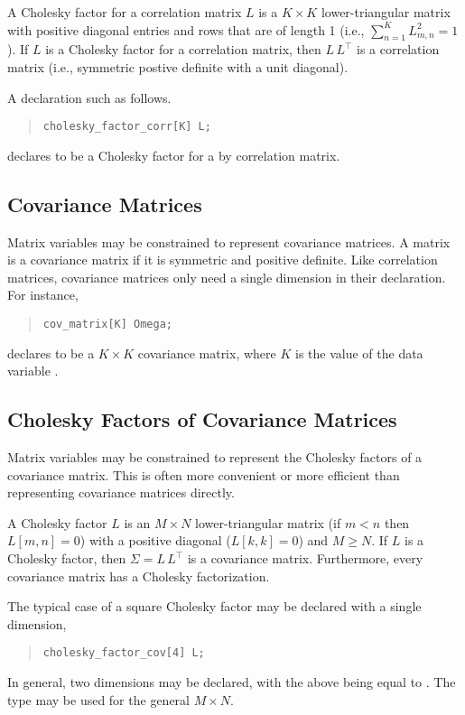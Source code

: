 A Cholesky factor for a correlation matrix $L$ is a $K \times K$
lower-triangular matrix with positive diagonal entries and rows that
are of length 1 (i.e., $\sum_{n=1}^K L_{m,n}^2 = 1$).  If $L$ is a
Cholesky factor for a correlation matrix, then $L\,L^{\top}$ is a
correlation matrix (i.e., symmetric postive definite with a unit
diagonal).

A declaration such as 
follows.
%
\begin{quote}
\begin{Verbatim}
cholesky_factor_corr[K] L;
\end{Verbatim}
\end{quote}
%
declares  to be a Cholesky factor for a  by 
correlation matrix.  

\subsection{Covariance Matrices}

Matrix variables may be constrained to represent covariance matrices.
A matrix is a covariance matrix if it is symmetric and positive
definite.  Like correlation matrices, covariance matrices only need a
single dimension in their declaration.  For instance,
%
\begin{quote}
\begin{Verbatim} 
cov_matrix[K] Omega;
\end{Verbatim}
\end{quote}
% 
declares  to be a $K \times K$ covariance matrix, where
$K$ is the value of the data variable .  

\subsection{Cholesky Factors of Covariance Matrices}

Matrix variables may be constrained to represent the Cholesky factors
of a covariance matrix.  This is often more convenient or more
efficient than representing covariance matrices directly.  

A Cholesky factor $L$ is an $M \times N$ lower-triangular matrix (if
$m < n$ then $L[m,n] =0$) with a positive diagonal ($L[k,k] = 0$) and
$M \geq N$.  If $L$ is a Cholesky factor, then $\Sigma = L \, L^{\top}$
is a covariance matrix.  Furthermore, every covariance matrix has a
Cholesky factorization.

The typical case of a square Cholesky factor may be declared with a
single dimension,
%
\begin{quote}
\begin{Verbatim}
cholesky_factor_cov[4] L;
\end{Verbatim}
\end{quote}
%
In general, two dimensions may be declared, with the above being equal to 
.  The
type  may be used for the general 
$M \times N$.


